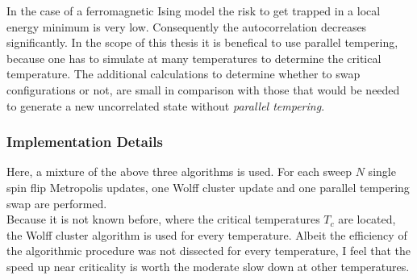         In the case of a ferromagnetic Ising model the risk to get trapped
        in a local energy minimum is very low. Consequently the autocorrelation
        decreases significantly. In the scope of this thesis it is benefical
        to use parallel tempering, because one has to simulate at many temperatures
        to determine the critical temperature. The additional calculations
        to determine whether to swap configurations or not, are small in
        comparison with those that would be needed to generate a new
        uncorrelated state without \emph{parallel tempering}.

    \subsubsection{Implementation Details}
        Here, a mixture of the above three algorithms is used.
        For each sweep \(N\) single spin flip Metropolis updates, one
        Wolff cluster update and one parallel tempering swap are
        performed.\\
        Because it is not known before, where the critical temperatures
        \(T_c\) are located, the Wolff cluster algorithm is used for
        every temperature. Albeit the efficiency of the algorithmic procedure
        was not dissected for every temperature, I feel that the speed up
        near criticality is worth the moderate slow down at other temperatures.

